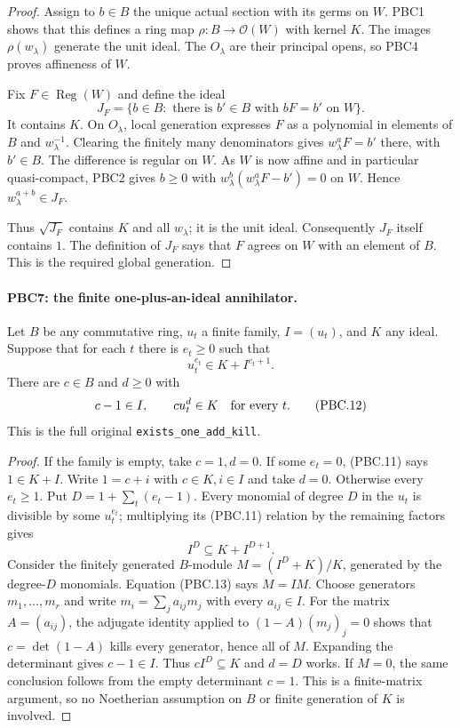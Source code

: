 \documentclass[11pt,a4paper]{article}
\numberwithin{equation}{section}
\theoremstyle{remark}\newtheorem{remark}[theorem]{Remark}
\begin{document}
\begin{proof}
Assign to $b\in B$ the unique actual section with its germs on
$W$.  PBC1 shows that this defines a ring map
$\rho:B\to\mathcal O(W)$ with kernel $K$.
The images $\rho(w_\lambda)$ generate the unit ideal.  The
$O_\lambda$ are their principal opens, so PBC4 proves affineness
of $W$.

Fix $F\in\operatorname{Reg}(W)$ and define the ideal
\[
 J_F=\{b\in B:\text{ there is }b'\in B
                  \text{ with }bF=b'\text{ on }W\}.
                                                        \tag{PBC.10}
\]
It contains $K$.  On $O_\lambda$, local generation expresses
$F$ as a polynomial in elements of $B$ and $w_\lambda^{-1}$.
Clearing the finitely many denominators gives
$w_\lambda^aF=b'$ there, with $b'\in B$.
The difference is regular on $W$.  As $W$ is now affine and in
particular quasi-compact, PBC2 gives $b\ge0$ with
$w_\lambda^b(w_\lambda^aF-b')=0$ on $W$.
Hence $w_\lambda^{a+b}\in J_F$.

Thus $\sqrt{J_F}$ contains $K$ and all $w_\lambda$; it is the
unit ideal.  Consequently $J_F$ itself contains $1$.
The definition of $J_F$ says that $F$ agrees on $W$ with an
element of $B$.  This is the required global generation.
\end{proof}

\paragraph{PBC7: the finite one-plus-an-ideal annihilator.}
\label{claim:PBC7}
Let $B$ be any commutative ring, $u_t$ a finite family,
$I=(u_t)$, and $K$ any ideal.  Suppose that for each $t$ there is
$e_t\ge0$ such that
\[
 u_t^{e_t}\in K+I^{e_t+1}.
                                                        \tag{PBC.11}
\]
There are $c\in B$ and $d\ge0$ with
\[
 c-1\in I,\qquad c u_t^d\in K\quad\hbox{for every }t.
                                                        \tag{PBC.12}
\]
This is the full original \texttt{exists\_\allowbreak one\_\allowbreak add\_\allowbreak kill}.

\begin{proof}
If the family is empty, take $c=1,d=0$.  If some $e_t=0$,
(PBC.11) says $1\in K+I$.  Write $1=c+i$ with $c\in K,i\in I$
and take $d=0$.
Otherwise every $e_t\ge1$.  Put
$D=1+\sum_t(e_t-1)$.  Every monomial of degree $D$ in the
$u_t$ is divisible by some $u_t^{e_t}$; multiplying its
(PBC.11) relation by the remaining factors gives
\[
 I^D\subseteq K+I^{D+1}.
                                                        \tag{PBC.13}
\]
Consider the finitely generated $B$-module
$M=(I^D+K)/K$, generated by the degree-$D$ monomials.
Equation (PBC.13) says $M=IM$.
Choose generators $m_1,\ldots,m_r$ and write
$m_i=\sum_j a_{ij}m_j$ with every $a_{ij}\in I$.
For the matrix $A=(a_{ij})$, the adjugate identity applied to
$(1-A)(m_j)_j=0$ shows that
$c=\det(1-A)$ kills every generator, hence all of $M$.
Expanding the determinant gives $c-1\in I$.
Thus $cI^D\subseteq K$ and $d=D$ works.
If $M=0$, the same conclusion follows from the empty determinant
$c=1$.  This is a finite-matrix argument, so no Noetherian
assumption on $B$ or finite generation of $K$ is involved.
\end{proof}
\end{document}
